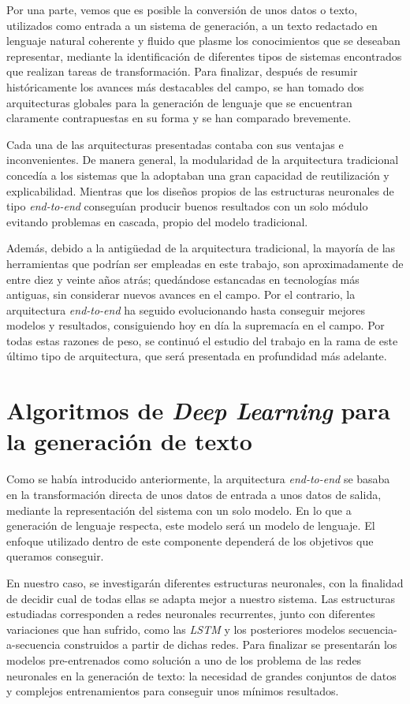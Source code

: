 Por una parte, vemos que es posible la conversión de unos datos o texto, utilizados como entrada a un sistema de generación, a un texto redactado en lenguaje natural coherente y fluido que plasme los conocimientos que se deseaban representar, mediante la identificación de diferentes tipos de sistemas encontrados que realizan tareas de transformación. Para finalizar, después de resumir históricamente los avances más destacables del campo, se han tomado dos arquitecturas globales para la generación de lenguaje que se encuentran claramente contrapuestas en su forma y se han comparado brevemente. 

Cada una de las arquitecturas presentadas contaba con sus ventajas e inconvenientes. De manera general, la modularidad de la arquitectura tradicional concedía a los sistemas que la adoptaban una gran capacidad de reutilización y explicabilidad. Mientras que los diseños propios de las estructuras neuronales de tipo \textit{end-to-end} conseguían producir buenos resultados con un solo módulo evitando problemas en cascada, propio del modelo tradicional. 

Además, debido a la antigüedad de la arquitectura tradicional, la mayoría de las herramientas que podrían ser empleadas en este trabajo, son aproximadamente de entre diez y veinte años atrás; quedándose estancadas en tecnologías más antiguas, sin considerar nuevos avances en el campo. Por el contrario, la arquitectura \textit{end-to-end} ha seguido evolucionando hasta conseguir mejores modelos y resultados, consiguiendo hoy en día la supremacía en el campo. Por todas estas razones de peso, se continuó el estudio del trabajo en la rama de este último tipo de arquitectura, que será presentada en profundidad más adelante.


\section{Algoritmos de \textit{Deep Learning} para la generación de texto}

Como se había introducido anteriormente, la arquitectura \textit{end-to-end} se basaba en la transformación directa de unos datos de entrada a unos datos de salida, mediante la representación del sistema con un solo modelo. En lo que a generación de lenguaje respecta, este modelo será un modelo de lenguaje. El enfoque utilizado dentro de este componente dependerá de los objetivos que queramos conseguir. 

En nuestro caso, se investigarán diferentes estructuras neuronales, con la finalidad de decidir cual de todas ellas se adapta mejor a nuestro sistema. Las estructuras estudiadas corresponden a redes neuronales recurrentes, junto con diferentes variaciones que han sufrido, como las \textit{LSTM} y los posteriores modelos secuencia-a-secuencia construidos a partir de dichas redes. Para finalizar se presentarán los modelos pre-entrenados como solución a uno de los problema de las redes neuronales en la generación de texto: la necesidad de grandes conjuntos de datos y complejos entrenamientos para conseguir unos mínimos resultados.



